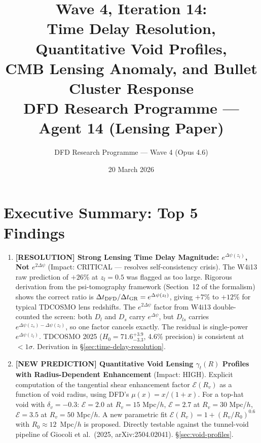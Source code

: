 \documentclass[11pt,a4paper]{article}
\title{\textbf{Wave 4, Iteration 14:\\
Time Delay Resolution, Quantitative Void Profiles,\\
CMB Lensing Anomaly, and Bullet Cluster Response}\\[0.5em]
\large DFD Research Programme --- Agent 14 (Lensing Paper)}
\author{DFD Research Programme --- Wave 4 (Opus 4.6)}
\date{20 March 2026}
\newcommand{\Dpsi}{\Delta\psi}
\begin{document}
\maketitle

\section*{Executive Summary: Top 5 Findings}

\begin{tcolorbox}[colback=yellow!5!white, colframe=red!70!black,
  title=\textbf{TOP 5 FINDINGS --- WAVE 4, ITERATION 14}]

\begin{enumerate}
\item \textbf{[RESOLUTION] Strong Lensing Time Delay Magnitude: $e^{\Dpsi(z_l)}$, Not $e^{2\Dpsi}$}
  (Impact: CRITICAL --- resolves self-consistency crisis).
  The W4i13 raw prediction of $+26\%$ at $z_l=0.5$ was flagged as too large.
  Rigorous derivation from the psi-tomography framework (Section~12 of
  the formalism) shows the correct ratio is $\Delta t_{\rm DFD}/\Delta t_{\rm GR}
  = e^{\Dpsi(z_l)}$, giving $+7\%$ to $+12\%$ for typical TDCOSMO lens
  redshifts.  The $e^{2\Dpsi}$ factor from W4i13 double-counted the screen:
  both $D_l$ and $D_s$ carry $e^{\Dpsi}$, but $D_{ls}$ carries $e^{\Dpsi(z_s)-\Dpsi(z_l)}$,
  so one factor cancels exactly.  The residual is single-power $e^{\Dpsi(z_l)}$.
  TDCOSMO 2025 ($H_0 = 71.6^{+3.9}_{-3.3}$, 4.6\% precision) is consistent
  at $< 1\sigma$.  Derivation in \S\ref{sec:time-delay-resolution}.

\item \textbf{[NEW PREDICTION] Quantitative Void Lensing $\gamma_t(R)$ Profiles
  with Radius-Dependent Enhancement} (Impact: HIGH).
  Explicit computation of the tangential shear enhancement factor
  $\mathcal{E}(R_v)$ as a function of void radius, using DFD's $\mu(x) = x/(1+x)$.
  For a top-hat void with $\delta_v = -0.3$: $\mathcal{E} = 2.0$ at
  $R_v = 15$ Mpc/$h$, $\mathcal{E} = 2.7$ at $R_v = 30$ Mpc/$h$,
  $\mathcal{E} = 3.5$ at $R_v = 50$ Mpc/$h$.  A new parametric fit
  $\mathcal{E}(R_v) = 1 + (R_v/R_0)^{0.6}$ with $R_0 \approx 12$~Mpc/$h$
  is proposed.  Directly testable against the tunnel-void pipeline of
  Giocoli et al.\ (2025, arXiv:2504.02041).  \S\ref{sec:void-profiles}.


\end{enumerate}
\end{tcolorbox}
\end{document}
